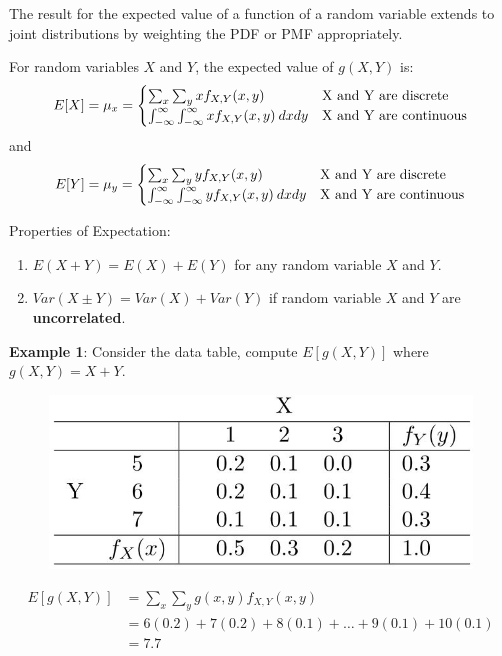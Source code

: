 \documentclass[10pt,a4paper]{article}
\begin{document}
The result for the expected value of a function of a random variable extends to joint distributions
by weighting the PDF or PMF appropriately.

\begin{tcolorbox}[breakable,colback=white]
    For random variables $X$ and $Y$, the expected value of $g(X,Y)$ is:
    \begin{align*}
        E[X] = \mu_x = 
        \begin{cases}
            \sum_x\sum_y xf_{X,Y}(x,y) & $X$ \text{ and } $Y$ \text{ are discrete} \\
            \int_{-\infty}^{\infty} \int_{-\infty}^{\infty} xf_{X,Y}(x,y)\: dx dy & $X$ \text{ and } $Y$ \text{ are continuous}
        \end{cases}
    \end{align*}
    and 
    \begin{align*}
        E[Y] = \mu_y = 
        \begin{cases}
            \sum_x\sum_y yf_{X,Y}(x,y) & $X$ \text{ and } $Y$ \text{ are discrete} \\
            \int_{-\infty}^{\infty} \int_{-\infty}^{\infty} yf_{X,Y}(x,y)\: dx dy & $X$ \text{ and } $Y$ \text{ are continuous}
        \end{cases}
    \end{align*}
\end{tcolorbox}

Properties of Expectation:
\begin{enumerate}
    \item $E(X+Y)=E(X)+E(Y)$ for any random variable $X$ and $Y$.
    \item $Var(X\pm Y) = Var(X) + Var(Y)$ if random variable $X$ and $Y$ are \textbf{uncorrelated}.
\end{enumerate}

\textbf{Example 1}: Consider the data table, compute $E[g(X,Y)]$ where $g(X,Y) = X + Y$.
\begin{figure} [h!]
    \centering
    \includegraphics[scale=0.4]{Expect_ex1.JPG}
\end{figure}
\begin{align*}
    E[g(X,Y)] &= \sum_x \sum_y g(x,y) f_{X,Y}(x,y) \\
    &= 6(0.2)+7(0.2)+8(0.1) + \dots + 9(0.1) + 10(0.1) \\
    &= 7.7 
\end{align*}
\end{document}
